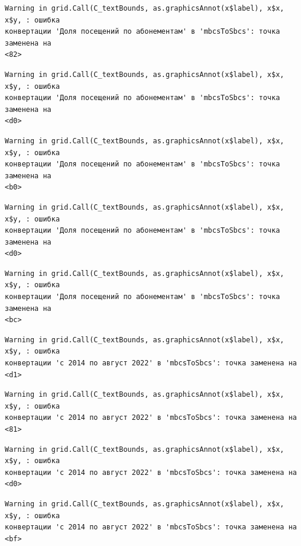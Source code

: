 \documentclass[
  letterpaper,
  DIV=11,
  numbers=noendperiod]{scrreprt}
\begin{document}
\begin{verbatim}
Warning in grid.Call(C_textBounds, as.graphicsAnnot(x$label), x$x, x$y, : ошибка
конвертации 'Доля посещений по абонементам' в 'mbcsToSbcs': точка заменена на
<82>
\end{verbatim}

\begin{verbatim}
Warning in grid.Call(C_textBounds, as.graphicsAnnot(x$label), x$x, x$y, : ошибка
конвертации 'Доля посещений по абонементам' в 'mbcsToSbcs': точка заменена на
<d0>
\end{verbatim}

\begin{verbatim}
Warning in grid.Call(C_textBounds, as.graphicsAnnot(x$label), x$x, x$y, : ошибка
конвертации 'Доля посещений по абонементам' в 'mbcsToSbcs': точка заменена на
<b0>
\end{verbatim}

\begin{verbatim}
Warning in grid.Call(C_textBounds, as.graphicsAnnot(x$label), x$x, x$y, : ошибка
конвертации 'Доля посещений по абонементам' в 'mbcsToSbcs': точка заменена на
<d0>
\end{verbatim}

\begin{verbatim}
Warning in grid.Call(C_textBounds, as.graphicsAnnot(x$label), x$x, x$y, : ошибка
конвертации 'Доля посещений по абонементам' в 'mbcsToSbcs': точка заменена на
<bc>
\end{verbatim}

\begin{verbatim}
Warning in grid.Call(C_textBounds, as.graphicsAnnot(x$label), x$x, x$y, : ошибка
конвертации 'с 2014 по август 2022' в 'mbcsToSbcs': точка заменена на <d1>
\end{verbatim}

\begin{verbatim}
Warning in grid.Call(C_textBounds, as.graphicsAnnot(x$label), x$x, x$y, : ошибка
конвертации 'с 2014 по август 2022' в 'mbcsToSbcs': точка заменена на <81>
\end{verbatim}

\begin{verbatim}
Warning in grid.Call(C_textBounds, as.graphicsAnnot(x$label), x$x, x$y, : ошибка
конвертации 'с 2014 по август 2022' в 'mbcsToSbcs': точка заменена на <d0>
\end{verbatim}

\begin{verbatim}
Warning in grid.Call(C_textBounds, as.graphicsAnnot(x$label), x$x, x$y, : ошибка
конвертации 'с 2014 по август 2022' в 'mbcsToSbcs': точка заменена на <bf>
\end{verbatim}
\end{document}
